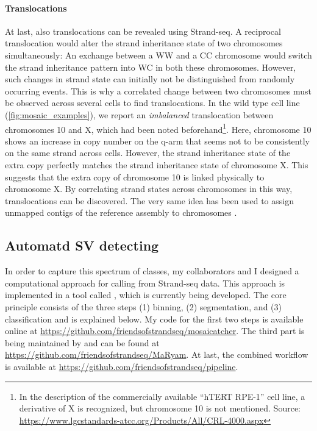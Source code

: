 \paragraph{Translocations}
At last, also translocations can be revealed using Strand-seq.  A reciprocal
translocation would alter the strand inheritance state of two chromosomes
simultaneously: An exchange between a WW and a CC chromosome would switch the
strand inheritance pattern into WC in both these chromosomes. However, such
changes in strand state can initially not be distinguished from randomly
occurring \sce events. This is why a correlated change between two chromosomes
must be observed across several cells to find translocations. In the \rpe wild
type cell line (\cref{fig:mosaic_examples}), we report an \emph{imbalanced}
translocation between chromosomes 10 and X, which had been noted
beforehand\footnote{In the description of the commercially available
    ``hTERT RPE-1'' cell line, a derivative of X is recognized, but chromosome
    10 is not mentioned. Source: \url{https://www.lgcstandards-atcc.org/Products/All/CRL-4000.aspx}}.
Here, chromosome 10 shows an increase in copy number on the q-arm that seems not
to be consistently on the same strand across cells. However, the strand
inheritance state of the extra copy perfectly matches the strand inheritance
state of chromosome X. This suggests that the extra copy of chromosome 10 is
linked physically to chromosome X. By correlating strand states across
chromosomes in this way, translocations can be discovered. The very same idea
has been used to assign unmapped contigs of the reference assembly to
chromosomes \citep{Hills2013}.







\FloatBarrier
\subsection{Automatd SV detecting}
\label{sec:mosaic_method}

In order to capture this spectrum of \sv classes, my collaborators and I
designed a computational approach for \sv calling from Strand-seq data.
This approach is implemented in a tool called \mc, which is currently being
developed. The core principle consists of the three steps (1) binning, (2)
segmentation, and (3) classification and is explained below. My code for the
first two steps is available online at
\url{https://github.com/friendsofstrandseq/mosaicatcher}.
The third part is being maintained by \maryam and can be found at
\url{https://github.com/friendsofstrandseq/MaRyam}. At last, the combined
workflow is available at \url{https://github.com/friendsofstrandseq/pipeline}.

